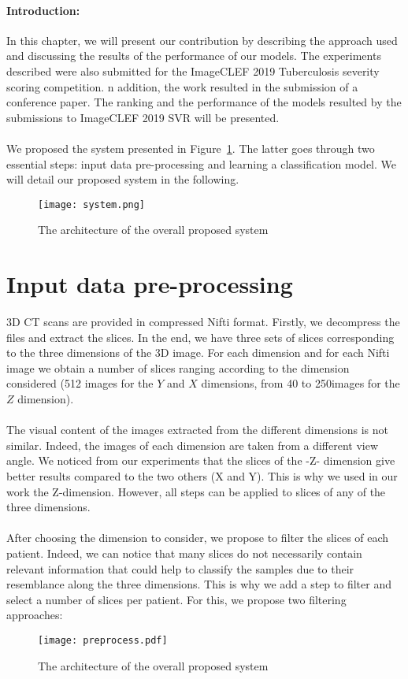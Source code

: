 \paragraph{Introduction:}In this chapter, we will present our contribution by describing the approach used and discussing the results of the performance of our models. The experiments described were also submitted for the ImageCLEF 2019 Tuberculosis severity scoring competition.  n addition, the work resulted in the submission of a conference paper. The ranking and the performance of the models resulted by the submissions to ImageCLEF 2019 SVR will be presented.

\paragraph{}
We proposed the system presented in Figure~\ref{fig:system}. The latter goes through two essential steps: input data pre-processing and learning a classification model. We will detail our proposed system in the following.
\begin{figure}[h!]
\texttt{[image: system.png]}
\caption{The architecture of the overall proposed system} 
\label{fig:system}
\end{figure}

\section{Input data pre-processing}
\label{preprocess}
3D CT scans are provided in compressed Nifti format. Firstly, we decompress the files and extract the slices. In the end, we have three sets of slices corresponding to the three dimensions of the 3D image. For each dimension and for each Nifti image we obtain a number of slices ranging according to the dimension considered (512 images for the $Y$ and $X$ dimensions, from 40 to 250images for the $Z$ dimension).
\paragraph{}
The visual content of the images extracted from the different dimensions is not similar. Indeed, the images of each dimension are taken from a different view angle. We noticed from our experiments that the slices of the -Z- dimension give better results compared to the two others (X and Y). This is why we used in our work the Z-dimension. However, all steps can be applied to slices of any of the three dimensions.
\paragraph{}
After choosing the dimension to consider, we propose to filter the slices of each patient. Indeed, we can notice that many slices do not necessarily contain relevant information that could help to classify the samples due to their resemblance along the three dimensions. This is why we add a step to filter and select a number of slices per patient. For this, we propose two filtering approaches:
\begin{figure}[h!]
\texttt{[image: preprocess.pdf]}
\caption{The architecture of the overall proposed system} 
\label{fig:preprocess}
\end{figure}

